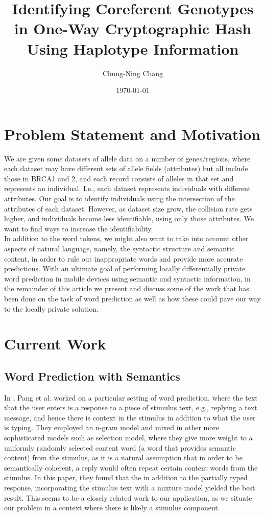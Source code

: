 \documentclass[14pt, oneside]{article}   	%
\title{Identifying Coreferent Genotypes in One-Way Cryptographic Hash Using Haplotype Information}
\author{Chung-Ning Chang}
\date{\today}							%
\begin{document}
\maketitle
\section{Problem Statement and Motivation}
We are given some datasets of allele data on a number of genes/regions, where each dataset may have different sets of allele fields (attributes) but all include those in BRCA1 and 2, and each record consists of alleles in that set and represents an individual. I.e., each dataset represents individuals with different attributes. Our goal is to identify individuals using the intersection of the attributes of each dataset. However, as dataset size grow, the collision rate gets higher, and individuals become less identifiable, using only those attributes. We want to find ways to increase the identifiability.
\\

In addition to the word tokens, we might also want to take into account other aspects of natural language,
namely, the syntactic structure and semantic content,
in order to rule out inappropriate words and provide more accurate predictions.
With an ultimate goal of performing locally differentially private word prediction
in mobile devices using semantic and syntactic information,
in the remainder of this article we present and discuss some of the work
that has been done on the task of word prediction
as well as how these could pave our way to the locally private solution.\\
%
%
%
%
%
%
%
%
%
\section{Current Work}
\subsection{Word Prediction with Semantics}
In \cite{pang2012revisiting},
Pang et al. worked on a particular setting of word prediction,
where the text that the user enters is a response to a piece of stimulus text, e.g., replying a text message,
and hence there is context in the stimulus in addition to what the user is typing.
They employed an n-gram model and mixed in other more sophisticated models such as
selection model, where they give more weight to a uniformly randomly selected content word
(a word that provides semantic content)
from the stimulus, as it is a natural assumption that in order to be semantically coherent,
a reply would often repeat certain content words from the stimulus.
In this paper, they found that the in addition to the partially typed response,
incorporating the stimulus text with a mixture model yielded the best result.
This seems to be a closely related work to our application,
as we situate our problem in a context where there is likely a stimulus component.\\
\end{document}
